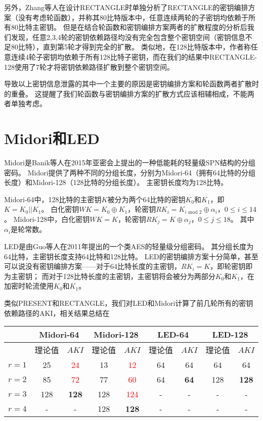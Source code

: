 另外，Zhang等人在设计RECTANGLE时单独分析了RECTANGLE的密钥编排方案（没有考虑轮函数），并称其80比特版本中，任意连续两轮的子密钥均依赖于所有80比特主密钥。
但是在结合轮函数和密钥编排方案两者的扩散程度的分析后我们发现，任意2,3,4轮的密钥依赖路径均没有完全包含整个密钥空间（密钥信息不足80比特），直到第5轮才得到完全的扩散。
类似地，在128比特版本中，作者称任意连续4轮子密钥均依赖于所有128比特子密钥，而在我们的结果中RECTANGLE-128使用了7轮才将密钥依赖路径扩散到整个密钥空间。

导致以上密钥信息泄露的其中一个主要的原因是密钥编排方案和轮函数两者扩散时的重叠。
这提醒了我们轮函数与密钥编排方案的扩散方式应该相辅相成，不能两者单独考虑。

\section{Midori和LED}
Midori是Banik等人在2015年亚密会上提出的一种低能耗的轻量级SPN结构的分组密码。
Midori提供了两种不同的分组长度，分别为Midori-64（拥有64比特的分组长度）和Midori-128（128比特的分组长度）。
主密钥长度均为128比特。

Midori-64中，128比特的主密钥$K$被分为两个64比特的密钥$K_0$和$K_1$，即$K=K_0||K_1$。
白化密钥$WK=K_0\oplus K_1$，轮密钥$RK_i=K_{i\mbox{ mod }2}\oplus\alpha_i$，$0\leq i\leq 14$。
Midori-128中，白化密钥$WK=K$，轮密钥$RK_j=K\oplus\alpha_j$，$0\leq j\leq 18$。
其中$\alpha_i$是轮常数。

LED是由Guo等人在2011年提出的一个类AES的轻量级分组密码。
其分组长度为64比特，主密钥长度支持64比特和128比特。
LED的密钥编排方案十分简单，甚至可以说没有密钥编排方案——对于64比特长度的主密钥，$RK_i=K$，即轮密钥即为主密钥；
而对于128比特长度的主密钥，主密钥将会被分为两部分$K_0$和$K_1$，在加密时轮流使用$K_0$和$K_1$。

类似PRESENT和RECTANGLE，我们对LED和Midori计算了前几轮所有的密钥依赖路径的AKI，相关结果总结在

\begin{table}[htbp]
\centering
\begin{tabular}{c|cc|cc|cc|cc}
\hline
&\multicolumn{2}{c|}{Midori-64\quad}&\multicolumn{2}{c|}{Midori-128}&\multicolumn{2}{c|}{LED-64\quad}&\multicolumn{2}{c}{LED-128}\\
\hline
&理论值&\quad $AKI$&理论值&\quad $AKI$&理论值&\quad $AKI$&理论值&\quad $AKI$\\
$r=1$&25&\textcolor{red}{24}&13&\textcolor{red}{12}&64&64&64&64\\
$r=2$&85 &\textcolor{red}{72}&77 &\textcolor{red}{60}&64& \textbf{64}  &128 &\textbf{128}\\
$r=3$&128 &\textbf{128} &128 &\textcolor{red}{124}&- &- &- &-\\
$r=4$&- &- &128 &\textbf{128}&- &- &- &-\\
\hline
\end{tabular}
\end{table}

